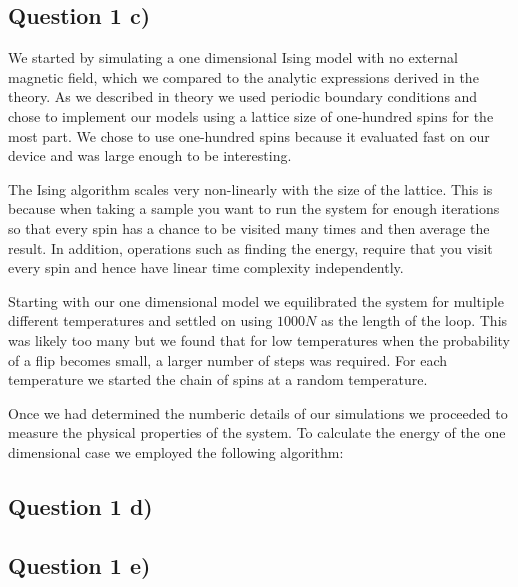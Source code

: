 \documentclass[a4paper, twocolumn]{article}
\begin{document}
\subsection*{Question 1 c)}
We started by simulating a one dimensional Ising model with no %
external magnetic field, which we compared to the analytic %
expressions derived in the theory. As we described in theory %
we used periodic boundary conditions and chose to implement %
our models using a lattice size of one-hundred spins for the %
most part. We chose to use one-hundred spins because it evaluated %
fast on our device and was large enough to be interesting. 


The Ising algorithm scales very non-linearly with the size of %
the lattice. This is because when taking a sample you want to run %
the system for enough iterations so that every spin has a chance %
to be visited many times and then average the result. In addition, %
operations such as finding the energy, require that you visit every %
spin and hence have linear time complexity independently. 


Starting with our one dimensional model we equilibrated the %
system for multiple different temperatures and settled on %
using \(1000N\) as the length of the loop. This was likely %
too many but we found that for low temperatures when the %
probability of a flip becomes small, a larger number of %
steps was required. For each temperature we started the chain %
of spins at a random temperature. 


Once we had determined the numberic details of our simulations %
we proceeded to measure the physical properties of the system. %
To calculate the energy of the one dimensional case we employed %
the following algorithm:


\subsection*{Question 1 d)}

\subsection*{Question 1 e)}
\end{document}
